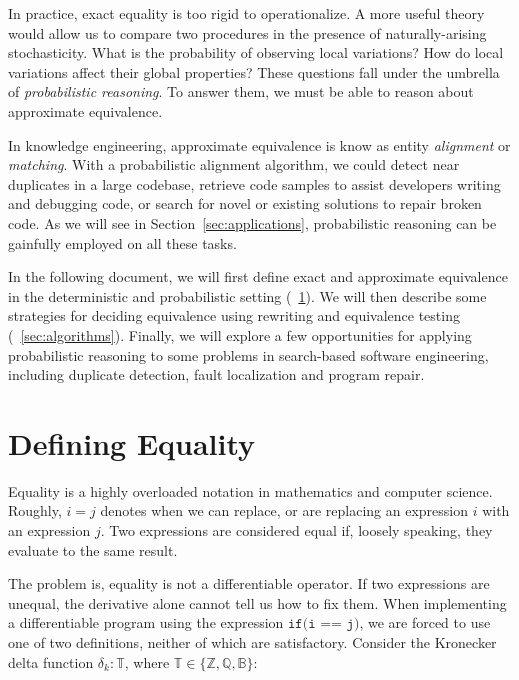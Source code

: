 \documentclass[11pt]{article}
\begin{document}
    In practice, exact equality is too rigid to operationalize. A more useful theory would allow us to compare two procedures in the presence of naturally-arising stochasticity. What is the probability of observing local variations? How do local variations affect their global properties? These questions fall under the umbrella of \textit{probabilistic reasoning}. To answer them, we must be able to reason about approximate equivalence.

    In knowledge engineering, approximate equivalence is know as entity \textit{alignment} or \textit{matching}. With a probabilistic alignment algorithm, we could detect near duplicates in a large codebase, retrieve code samples to assist developers writing and debugging code, or search for novel or existing solutions to repair broken code. As we will see in Section~\ref{sec:applications}, probabilistic reasoning can be gainfully employed on all these tasks.

    In the following document, we will first define exact and approximate equivalence in the deterministic and probabilistic setting (~\ref{sec:definitions}). We will then describe some strategies for deciding equivalence using rewriting and equivalence testing (~\ref{sec:algorithms}). Finally, we will explore a few opportunities for applying probabilistic reasoning to some problems in search-based software engineering, including duplicate detection, fault localization and program repair.

    \pagebreak

    \section{Defining Equality}\label{sec:definitions}

    Equality is a highly overloaded notation in mathematics and computer science. Roughly, $i = j$ denotes when we can replace, or are replacing an expression $i$ with an expression $j$. Two expressions are considered equal if, loosely speaking, they evaluate to the same result.

    The problem is, equality is not a differentiable operator. If two expressions are unequal, the derivative alone cannot tell us how to fix them. When implementing a differentiable program using the expression $\texttt{if(i == j)}$, we are forced to use one of two definitions, neither of which are satisfactory. Consider the Kronecker delta function $\delta_k: \mathbb{T}$, where $\mathbb{T} \in \{\mathbb{Z, Q, B}\}$:
\end{document}
